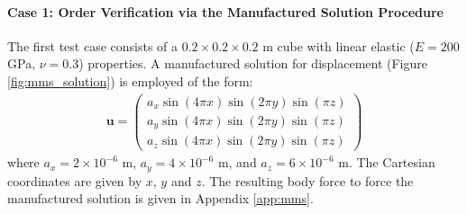 \documentclass[sn-mathphys,Numbered]{sn-jnl}%
\newcommand{\bb}{\boldsymbol}
\begin{document}
\paragraph{Case 1: Order Verification via the Manufactured Solution Procedure}
The first test case consists of a $0.2 \times 0.2 \times 0.2$ m cube with linear elastic ($E = 200$ GPa, $\nu = 0.3$) properties.
A manufactured solution for displacement (Figure \ref{fig:mms_solution}) is employed of the form:
\begin{eqnarray}
	\bb{u} =
	\begin{pmatrix}
	a_x \sin(4\pi x) \sin(2\pi y) \sin(\pi z) \\
	a_y \sin(4 \pi x) \sin(2 \pi y) \sin(\pi z) \\
	a_z \sin(4 \pi x) \sin(2 \pi y) \sin(\pi z) 
	\end{pmatrix}
\end{eqnarray}
where $a_x = 2\times10^{-6}$ m, $a_y = 4\times10^{-6}$ m, and $a_z = 6\times10^{-6}$ m.
The Cartesian coordinates are given by $x$, $y$ and $z$.
The resulting body force to force the manufactured solution is given in Appendix \ref{app:mms}.
\end{document}

